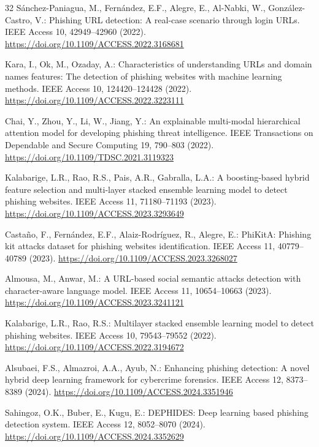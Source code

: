 \documentclass[conference]{IEEEtran}
\begin{document}
\begin{thebibliography}{32}
S{\'a}nchez-Paniagua, M., Fern{\'a}ndez, E.F., Alegre, E., Al-Nabki, W., Gonz{\'a}lez-Castro, V.: Phishing URL detection: A real-case scenario through login URLs. IEEE Access 10, 42949--42960 (2022). \url{https://doi.org/10.1109/ACCESS.2022.3168681}

Kara, I., Ok, M., Ozaday, A.: Characteristics of understanding URLs and domain names features: The detection of phishing websites with machine learning methods. IEEE Access 10, 124420--124428 (2022). \url{https://doi.org/10.1109/ACCESS.2022.3223111}

Chai, Y., Zhou, Y., Li, W., Jiang, Y.: An explainable multi-modal hierarchical attention model for developing phishing threat intelligence. IEEE Transactions on Dependable and Secure Computing 19, 790--803 (2022). \url{https://doi.org/10.1109/TDSC.2021.3119323}

Kalabarige, L.R., Rao, R.S., Pais, A.R., Gabralla, L.A.: A boosting-based hybrid feature selection and multi-layer stacked ensemble learning model to detect phishing websites. IEEE Access 11, 71180--71193 (2023). \url{https://doi.org/10.1109/ACCESS.2023.3293649}

Casta{\~n}o, F., Fern{\'a}ndez, E.F., Alaiz-Rodr{\'i}guez, R., Alegre, E.: PhiKitA: Phishing kit attacks dataset for phishing websites identification. IEEE Access 11, 40779--40789 (2023). \url{https://doi.org/10.1109/ACCESS.2023.3268027}

Almousa, M., Anwar, M.: A URL-based social semantic attacks detection with character-aware language model. IEEE Access 11, 10654--10663 (2023). \url{https://doi.org/10.1109/ACCESS.2023.3241121}

Kalabarige, L.R., Rao, R.S.: Multilayer stacked ensemble learning model to detect phishing websites. IEEE Access 10, 79543--79552 (2022). \url{https://doi.org/10.1109/ACCESS.2022.3194672}

Alsubaei, F.S., Almazroi, A.A., Ayub, N.: Enhancing phishing detection: A novel hybrid deep learning framework for cybercrime forensics. IEEE Access 12, 8373--8389 (2024). \url{https://doi.org/10.1109/ACCESS.2024.3351946}

Sahingoz, O.K., Buber, E., Kugu, E.: DEPHIDES: Deep learning based phishing detection system. IEEE Access 12, 8052--8070 (2024). \url{https://doi.org/10.1109/ACCESS.2024.3352629}


\end{thebibliography}
\end{document}

